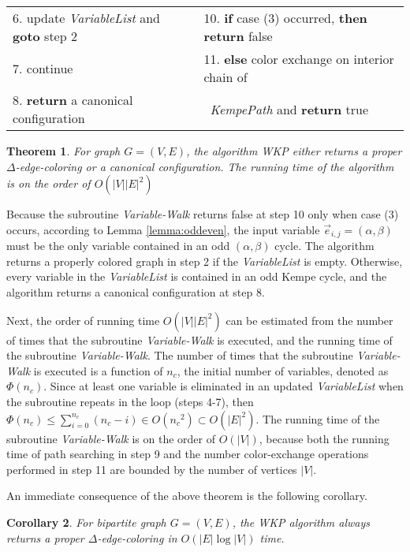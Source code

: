 \documentclass[11pt]{article}
\newtheorem{theorem}{Theorem}[section]
\newtheorem{corollary}[theorem]{Corollary}
\newenvironment{proof}[1][Proof]{\begin{trivlist}
\item[\hskip \labelsep {\bfseries #1}]}{\end{trivlist}}
\newcommand{\qed}{\nobreak \ifvmode \relax \else
      \ifdim\lastskip<1.5em \hskip-\lastskip
      \hskip1.5em plus0em minus0.5em \fi \nobreak
      \vrule height0.75em width0.5em depth0.25em\fi}
\begin{document}
\begin{table}[htbp]
{\begin{tabular}{|l|l| }
			6. \quad \quad {\bf then} update {\it VariableList} and {\bf goto} step 2 &  10.	{\bf if} case (3) occurred, {\bf then return} false \\
			7. \quad \quad {\bf else} continue 															 &  11. {\bf else} color exchange on interior chain of \\
			8. {\bf return} a canonical configuration                        &	\quad ~{\it KempePath} and {\bf return} true\\	
			\hline		
		\end{tabular}	
		}
	\label{algo:WKPAlgo}
\end{table}


\begin{theorem}
\label{theorem:canonical}
For graph $G=(V,E)$, the algorithm WKP either returns a proper $\Delta$-edge-coloring or a canonical configuration. The running time of the algorithm is on the order of $O(|V||E|^2)$
\end{theorem}

\begin{proof}
Because the subroutine {\it Variable-Walk} returns false at step 10 only when case (3) occurs, according to Lemma \ref{lemma:oddeven}, the input variable $\vec{ e}_{i,j}=(\alpha,\beta)$ must be the only variable contained in an odd $(\alpha,\beta)$ cycle. The algorithm returns a properly colored graph in step 2 if the {\it VariableList} is empty. Otherwise, every variable in the {\it VariableList} is contained in an odd Kempe cycle, and the algorithm returns a canonical configuration at step 8.

Next, the order of running time $O(|V| |E|^2)$ can be estimated from the number of times that the subroutine {\it Variable-Walk} is executed, and the running time of the subroutine {\it Variable-Walk}. The number of times that the subroutine {\it Variable-Walk} is executed is a function of $n_c$, the initial number of variables, denoted as $\Phi(n_c)$. Since at least one variable is eliminated in an updated {\it VariableList} when the subroutine repeats in the loop (steps 4-7), then $\Phi(n_c) \leq \sum_{i=0}^{n_c}(n_c -i) \in O({n_c}^{2})\subset O(|E|^2) $. The running time of the subroutine {\it Variable-Walk} is on the order of $O(|V|)$, because both the running time of path searching in step 9 and the number color-exchange operations performed in step 11 are bounded by the number of vertices $|V|$. \qed
\end{proof}

An immediate consequence of the above theorem is the following corollary.
\begin{corollary}
For bipartite graph $G=(V,E)$, the WKP algorithm always returns a proper $\Delta$-edge-coloring in $O(|E|\log{|V|})$ time.
\end{corollary}
\end{document}
